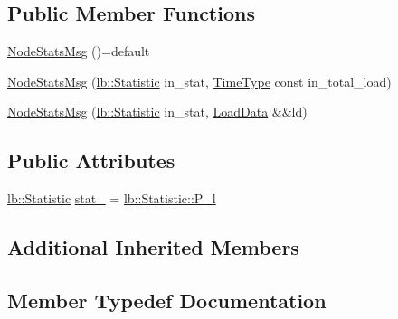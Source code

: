 \subsection*{Public Member Functions}
\begin{DoxyCompactItemize}
\item 
\hyperlink{structvt_1_1vrt_1_1collection_1_1balance_1_1_node_stats_msg_a4d1c09dda8b28b2ca0b96ed19ab6ee1c}{Node\+Stats\+Msg} ()=default
\item 
\hyperlink{structvt_1_1vrt_1_1collection_1_1balance_1_1_node_stats_msg_a47bbd1a5126c30f3873824f2698b8413}{Node\+Stats\+Msg} (\hyperlink{namespacevt_1_1vrt_1_1collection_1_1lb_af0e20ef9afee77295053aa83bf1348b1}{lb\+::\+Statistic} in\+\_\+stat, \hyperlink{namespacevt_a876a9d0cd5a952859c72de8a46881442}{Time\+Type} const in\+\_\+total\+\_\+load)
\item 
\hyperlink{structvt_1_1vrt_1_1collection_1_1balance_1_1_node_stats_msg_a2ff50c69756cb7cbadc32aee9f2b0fb4}{Node\+Stats\+Msg} (\hyperlink{namespacevt_1_1vrt_1_1collection_1_1lb_af0e20ef9afee77295053aa83bf1348b1}{lb\+::\+Statistic} in\+\_\+stat, \hyperlink{structvt_1_1vrt_1_1collection_1_1balance_1_1_load_data}{Load\+Data} \&\&ld)
\end{DoxyCompactItemize}
\subsection*{Public Attributes}
\begin{DoxyCompactItemize}
\item 
\hyperlink{namespacevt_1_1vrt_1_1collection_1_1lb_af0e20ef9afee77295053aa83bf1348b1}{lb\+::\+Statistic} \hyperlink{structvt_1_1vrt_1_1collection_1_1balance_1_1_node_stats_msg_a733572c8a92c1b72f059c99feecb02e3}{stat\+\_\+} = \hyperlink{namespacevt_1_1vrt_1_1collection_1_1lb_af0e20ef9afee77295053aa83bf1348b1af76181d80de89c5736a21709e19caa61}{lb\+::\+Statistic\+::\+P\+\_\+l}
\end{DoxyCompactItemize}
\subsection*{Additional Inherited Members}


\subsection{Member Typedef Documentation}
\mbox{\label{structvt_1_1vrt_1_1collection_1_1balance_1_1_node_stats_msg_a43e175250ef898f201a7c19e5204ba93}} 
